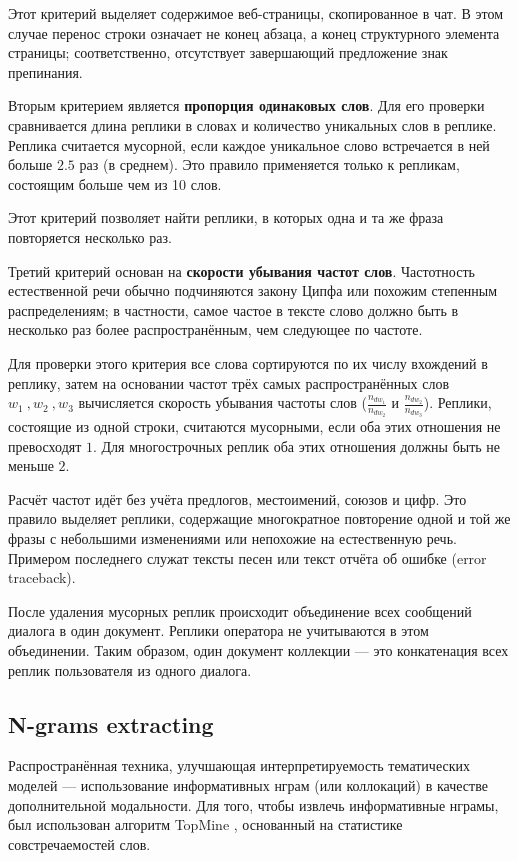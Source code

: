 Этот критерий выделяет содержимое веб-страницы, скопированное в чат. В этом случае перенос строки означает не конец абзаца, а конец структурного элемента страницы; соответственно, отсутствует завершающий предложение знак препинания.

Вторым критерием является \textbf{пропорция одинаковых слов}. Для его проверки сравнивается длина реплики в словах и количество уникальных слов в реплике. Реплика считается мусорной, если каждое уникальное слово встречается в ней больше $2.5$ раз (в среднем). Это правило применяется только к репликам, состоящим больше чем из 10 слов.

Этот критерий позволяет найти реплики, в которых одна и та же фраза повторяется несколько раз.

Третий критерий основан на \textbf{скорости убывания частот слов}. Частотность естественной речи обычно подчиняются закону Ципфа или похожим степенным распределениям; в частности, самое частое в тексте слово должно быть в несколько раз более распространённым, чем следующее по частоте. 

Для проверки этого критерия все слова сортируются по их числу вхождений в реплику, затем на основании частот трёх самых распространённых слов $w_1~,w_2~,w_3$ вычисляется скорость убывания частоты слов ($\frac{n_{d{w_1}}}{n_{dw_2}}$ и $\frac{n_{d{w_2}}}{n_{dw_3}}$). Реплики, состоящие из одной строки, считаются мусорными, если оба этих отношения не превосходят $1$. Для многострочных реплик оба этих отношения должны быть не меньше $2$.

Расчёт частот идёт без учёта предлогов, местоимений, союзов и цифр. Это правило выделяет реплики, содержащие многократное повторение одной и той же фразы с небольшими изменениями или непохожие на естественную речь. Примером последнего служат тексты песен или текст отчёта об ошибке (error traceback).

После удаления мусорных реплик происходит объединение всех сообщений диалога в один документ. Реплики оператора не учитываются в этом объединении. Таким образом, один документ коллекции --- это конкатенация всех реплик пользователя из одного диалога.

\subsection{N-grams extracting}

\par Распространённая техника, улучшающая интерпретируемость тематических моделей --- использование информативных нграм (или коллокаций) в качестве дополнительной модальности. Для того, чтобы извлечь информативные нграмы, был использован алгоритм TopMine \cite{topmine}, основанный на статистике совстречаемостей слов.

